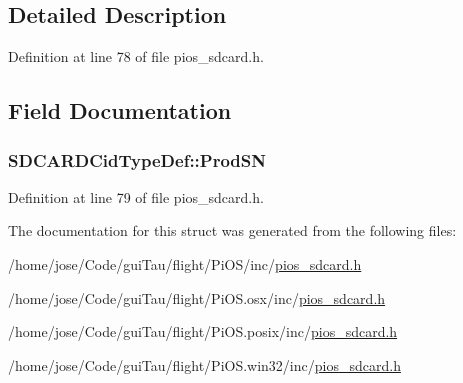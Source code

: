 \subsection{Detailed Description}


Definition at line 78 of file pios\-\_\-sdcard.\-h.



\subsection{Field Documentation}
\hypertarget{struct_s_d_c_a_r_d_cid_type_def_a3715cb072043477cb6821ce937c498f8}{
\subsubsection[{Prod\-S\-N}]{ S\-D\-C\-A\-R\-D\-Cid\-Type\-Def\-::\-Prod\-S\-N}}\label{struct_s_d_c_a_r_d_cid_type_def_a3715cb072043477cb6821ce937c498f8}


Definition at line 79 of file pios\-\_\-sdcard.\-h.



The documentation for this struct was generated from the following files\-:\begin{DoxyCompactItemize}
\item 
/home/jose/\-Code/gui\-Tau/flight/\-Pi\-O\-S/inc/\hyperlink{inc_2pios__sdcard_8h}{pios\-\_\-sdcard.\-h}\item 
/home/jose/\-Code/gui\-Tau/flight/\-Pi\-O\-S.\-osx/inc/\hyperlink{osx_2inc_2pios__sdcard_8h}{pios\-\_\-sdcard.\-h}\item 
/home/jose/\-Code/gui\-Tau/flight/\-Pi\-O\-S.\-posix/inc/\hyperlink{posix_2inc_2pios__sdcard_8h}{pios\-\_\-sdcard.\-h}\item 
/home/jose/\-Code/gui\-Tau/flight/\-Pi\-O\-S.\-win32/inc/\hyperlink{win32_2inc_2pios__sdcard_8h}{pios\-\_\-sdcard.\-h}\end{DoxyCompactItemize}
